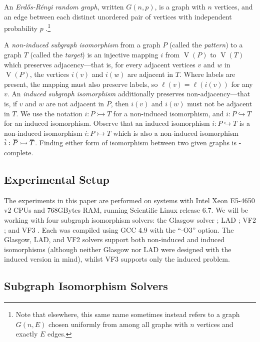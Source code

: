 \documentclass[twoside,11pt]{article}
\newcommand{\shortoverline}[1]{\mkern 1.5mu\overline{\mkern-1.5mu#1\mkern-1.5mu}\mkern 1.5mu}
\begin{document}
An \emph{Erd\H{o}s-R\'enyi random graph}, written $G(n, p)$, is a graph with $n$ vertices, and an
edge between each distinct unordered pair of vertices with independent probability $p$
\cite{o:Gilbert59,o:ErdosR59}.\footnote{Note that elsewhere, this same name sometimes instead
refers to a graph $G(n, E)$ chosen uniformly from among all graphs with $n$ vertices and exactly $E$
edges.}

A \emph{non-induced subgraph isomorphism} from a graph $P$ (called the \emph{pattern}) to a graph
$T$ (called the \emph{target}) is an injective mapping $i$ from $\operatorname{V}(P)$ to
$\operatorname{V}(T)$ which preserves adjacency---that is, for every adjacent vertices $v$ and $w$ in
$\operatorname{V}(P)$, the vertices $i(v)$ and $i(w)$ are adjacent in $T$. Where labels are present,
the mapping must also preserve labels, so $\ell(v) = \ell(i(v))$ for any $v$. An \emph{induced
subgraph isomorphism} additionally preserves non-adjacency---that is, if $v$ and $w$ are not
adjacent in $P$, then $i(v)$ and $i(w)$ must not be adjacent in $T$. We use the notation $i : P
\rightarrowtail T$ for a non-induced isomorphism, and $i : P \hookrightarrow T$ for an induced
isomorphism. Observe that an induced isomorphism $i : P \hookrightarrow T$ is a non-induced
isomorphism $i : P \rightarrowtail T$ which is also a non-induced isomorphism $\shortoverline{i} :
\shortoverline{P} \rightarrowtail \shortoverline{T}$. Finding either form of isomorphism between two
given graphs is \NP-complete.

\subsection{Experimental Setup}

The experiments in this paper are performed on systems with Intel Xeon E5-4650 v2 CPUs and 768GBytes
RAM, running Scientific Linux release 6.7. We will be working with four subgraph isomorphism
solvers: the Glasgow solver \cite{DBLP:conf/cp/McCreeshP15,DBLP:conf/lion/KotthoffMS16}; LAD
\cite{DBLP:journals/ai/Solnon10}; VF2 \cite{DBLP:journals/pami/CordellaFSV04}; and VF3
\cite{DBLP:conf/gbrpr/CarlettiFSV17}. Each was compiled using GCC 4.9 with the ``-O3'' option.
The Glasgow, LAD, and VF2 solvers support both non-induced and induced isomorphisms (although
neither Glasgow nor LAD were designed with the induced version in mind), whilst VF3 supports only
the induced problem.

\subsection{Subgraph Isomorphism Solvers}
\end{document}
